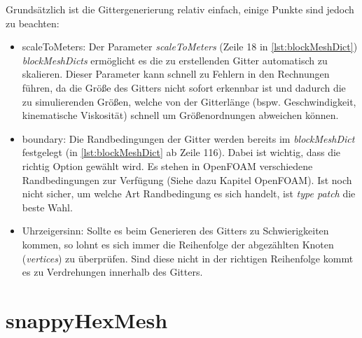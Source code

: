 Grundsätzlich ist die Gittergenerierung relativ einfach, einige Punkte sind jedoch zu beachten: 
\begin{itemize}
  \item scaleToMeters: Der Parameter \textit{scaleToMeters} (Zeile 18 in \autoref{lst:blockMeshDict}) \textit{blockMeshDicts} ermöglicht es die zu erstellenden Gitter automatisch zu skalieren. Dieser Parameter kann schnell zu Fehlern in den Rechnungen führen, da die Größe des Gitters nicht sofort erkennbar ist und dadurch die zu simulierenden Größen, welche von der Gitterlänge (bspw. Geschwindigkeit, kinematische Viskosität) schnell um Größenordnungen abweichen können. 
  \item boundary: Die Randbedingungen der Gitter werden bereits im \textit{blockMeshDict} festgelegt (in \autoref{lst:blockMeshDict} ab Zeile 116). Dabei ist wichtig, dass die richtig Option gewählt wird. Es stehen in OpenFOAM verschiedene Randbedingungen zur Verfügung (Siehe dazu Kapitel OpenFOAM). Ist noch nicht sicher, um welche Art Randbedingung es sich handelt, ist \textit{type patch} die beste Wahl. 
  \item Uhrzeigersinn: Sollte es beim Generieren des Gitters zu Schwierigkeiten kommen, so lohnt es sich immer die Reihenfolge der abgezählten Knoten (\textit{vertices}) zu überprüfen. Sind diese nicht in der richtigen Reihenfolge kommt es zu Verdrehungen innerhalb des Gitters.
\end{itemize}

\newpage

\section{snappyHexMesh}

